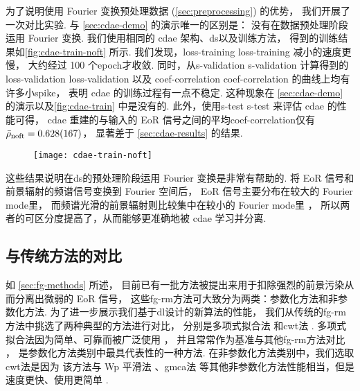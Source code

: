 为了说明使用 Fourier 变换预处理数据 (\autoref{sec:preprocessing}) 的优势，
我们开展了一次对比实验.
与 \autoref{sec:cdae-demo} 的演示唯一的区别是：
没有在数据预处理阶段运用 Fourier 变换.
我们使用相同的 \ac{cdae} 架构、\ac{ds}以及训练方法，
得到的训练结果如\autoref{fig:cdae-train-noft} 所示.
我们发现，\acl{loss-training} \ac{loss-training} 减小的速度更慢，
大约经过 100 个\ac{epoch}才收敛.
同时，从\acl{s-validation} \ac{s-validation}
计算得到的\acl{loss-validation} \ac{loss-validation} 以及
\acl{coef-correlation} \ac{coef-correlation}
的曲线上均有许多小\ac{spike}，
表明 \ac{cdae} 的训练过程有一点不稳定.
这种现象在 \autoref{sec:cdae-demo} 的演示以及\autoref{fig:cdae-train}
中是没有的.
此外，使用\acl{s-test} \ac{s-test} 来评估 \ac{cdae} 的性能可得，
\ac{cdae} 重建的与输入的 EoR 信号之间的平均\acl{coef-correlation}仅有
$\bar{\rho}_{\mathrm{noft}} = \num{0.628 +- 0.167}$，
显著差于 \autoref{sec:cdae-results} 的结果.

\begin{figure}[htp]
  \centering
  \texttt{[image: cdae-train-noft]}
  \label{fig:cdae-train-noft}
\end{figure}

这些结果说明在\ac{ds}的预处理阶段运用 Fourier 变换是非常有帮助的.
将 EoR 信号和前景辐射的频谱信号变换到 Fourier 空间后，
EoR 信号主要分布在较大的 Fourier \ac{mode}里，
而频谱光滑的前景辐射则比较集中在较小的 Fourier \ac{mode}里 \cite{parsons2012}，
所以两者的可区分度提高了，从而能够更准确地被 \ac{cdae} 学习并分离.

\subsection{与传统方法的对比}

如 \autoref{sec:fg-methods} 所述，
目前已有一批方法被提出来用于扣除强烈的前景污染从而分离出微弱的 EoR 信号，
这些\ac{fg-rm}方法可大致分为两类：参数化方法和非参数化方法.
为了进一步展示我们基于\ac{dl}设计的新算法的性能，
我们从传统的\ac{fg-rm}方法中挑选了两种典型的方法进行对比，
分别是多项式拟合法\cite{wang2006} 和\ac{cwt}法 \cite{gu2013}.
多项式拟合法因为简单、可靠而被广泛使用 \cite{jelic2008,liu2009ps,pritchard2010}，
并且常常作为基准与其他\ac{fg-rm}方法对比 \cite{harker2009,alonso2015,chapman2015}，
是参数化方法类别中最具代表性的一种方法.
在非参数化方法类别中，我们选取\ac{cwt}法是因为
该方法与 Wp 平滑法 \cite{harker2009}、\ac{gmca}法 \cite{chapman2013}
等其他非参数化方法性能相当，但是速度更快、使用更简单 \cite{gu2013,chapman2015}.

